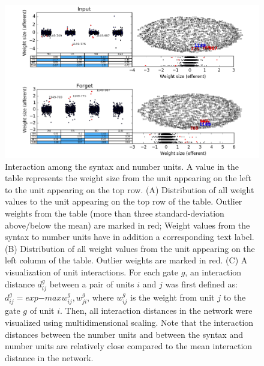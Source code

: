 \begin{figure}
\centering
\includegraphics[width=\textwidth]{Figures/Figure7_interactions.png}
\caption{Interaction among the syntax and number units. A value in the table represents the weight size from the unit appearing on the left to the unit appearing on the top row. (A) Distribution of all weight values to the unit appearing on the top row of the table. Outlier weights from the table (more than three standard-deviation above/below the mean) are marked in red; Weight values from the syntax to number units have in addition a corresponding text label. (B) Distribution of all weight values from the unit appearing on the left column of the table. Outlier weights are marked in red. (C)  A visualization of unit interactions. For each gate $g$, an interaction distance $d_{ij}^g$ between a pair of units $i$ and $j$ was first defined as: $d_{ij}^g=exp{-max{w_{ij}^g, w_{ji}^g}}$, where $w_{ij}^g$ is the weight from unit $j$ to the gate $g$ of unit $i$. Then, all interaction distances in the network were visualized using multidimensional scaling. Note that the interaction distances between the number units and between the syntax and number units are relatively close compared to the mean interaction distance in the network.}
\end{figure}

